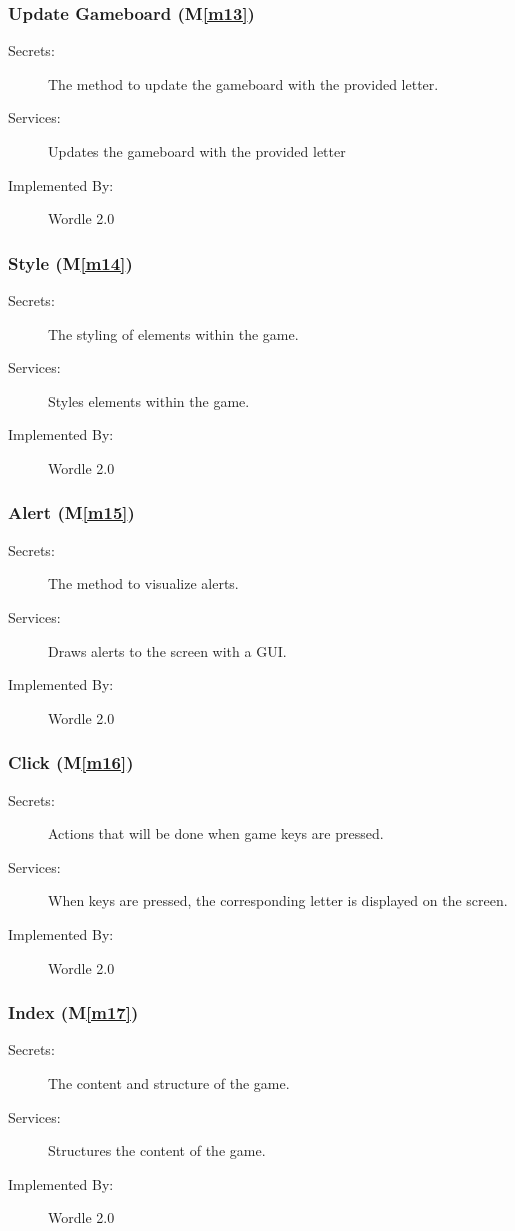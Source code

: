 \documentclass[12pt, titlepage]{article}
\newcommand{\mref}[1]{M\ref{#1}}
\begin{document}
	\subsubsection{Update Gameboard (\mref{m13})}
	\begin{description}
		\item[Secrets:]The method to update the gameboard with the provided letter.
		\item[Services:] Updates the gameboard with the provided letter
		\item[Implemented By:] Wordle 2.0
	\end{description}
	
	\subsubsection{Style (\mref{m14})}
	\begin{description}
		\item[Secrets:]The styling of elements within the game.
		\item[Services:]Styles elements within the game.
		\item[Implemented By:] Wordle 2.0
	\end{description}
	
	\subsubsection{Alert (\mref{m15})}
	\begin{description}
		\item[Secrets:]The method to visualize alerts.
		\item[Services:]Draws alerts to the screen with a GUI.
		\item[Implemented By:] Wordle 2.0
	\end{description}
	
	\subsubsection{Click (\mref{m16})}
	\begin{description}
		\item[Secrets:]Actions that will be done when game keys are pressed.
		\item[Services:]When keys are pressed, the corresponding letter is displayed on the screen.
		\item[Implemented By:] Wordle 2.0
	\end{description}
	
	\subsubsection{Index (\mref{m17})}
	\begin{description}
		\item[Secrets:]The content and structure of the game.
		\item[Services:]Structures the content of the game.
		\item[Implemented By:] Wordle 2.0
	\end{description}
	
\end{document}
